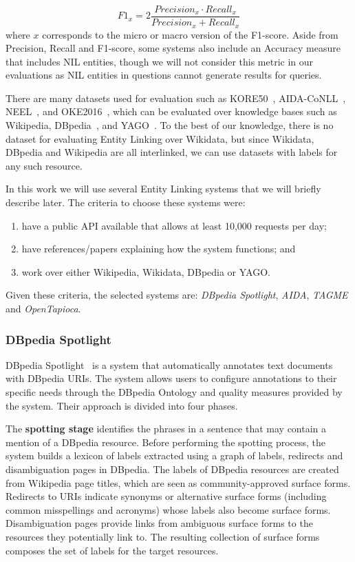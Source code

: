\[
    F1_x = 2 \frac{Precision_x \cdot Recall_x}{Precision_x + Recall_x}
\]
\noindent where $x$ corresponds to the micro or macro version of the F1-score. Aside from Precision, 
Recall and F1-score, some systems also include an Accuracy measure that includes NIL entities, 
though we will not consider this metric in our evaluations as NIL entities in questions 
cannot generate results for queries.

There are many datasets used for evaluation such as KORE50~\cite{entlin:HoffartSNTW12}, 
AIDA-CoNLL~\cite{EL:aida-HoffartYBFPSTTW11}, NEEL~\cite{entlin:RizzoBPV15}, and 
OKE2016~\cite{entlin:Plu0T16}, which can be evaluated over knowledge bases such as Wikipedia, 
DBpedia~\cite{KG:dbpedia}, and YAGO~\cite{KG:yago}. To the best of our knowledge, there is 
no dataset for evaluating Entity Linking over Wikidata, but since Wikidata, DBpedia and 
Wikipedia are all interlinked, we can use datasets with labels for any such resource.

In this work we will use several Entity Linking systems that we will briefly describe later. 
The criteria to choose these systems were: 

\begin{enumerate}
    \item have a public API available that allows at least 10,000 requests per day; 
    \item have references/papers explaining how the system functions; and 
    \item work over either Wikipedia, Wikidata, DBpedia or YAGO. 
\end{enumerate}

Given these criteria, the selected systems are: \textit{DBpedia Spotlight}, \textit{AIDA}, 
\textit{TAGME} and \textit{OpenTapioca}.

\subsubsection{DBpedia Spotlight}
\label{cap2:theoFrame/infExtr/entityLinking/dbpediaSpotlight}
DBpedia Spotlight~\cite{EL:dbpedia-spotlight-MendesJGB11} is a system that automatically 
annotates text documents with DBpedia URIs. The system allows users to configure annotations 
to their specific needs through the DBpedia Ontology and quality measures provided by the 
system. Their approach is divided into four phases.

The \textbf{spotting stage} identifies the phrases in a sentence that may contain a mention 
of a DBpedia resource. Before performing the spotting process, the system builds a lexicon 
of labels extracted using a graph of labels, redirects and disambiguation pages in 
DBpedia. The labels of DBpedia resources are created from Wikipedia page titles, which are 
seen as community-approved surface forms. Redirects to URIs indicate synonyms or alternative 
surface forms (including common misspellings and acronyms) whose labels also become surface 
forms. Disambiguation pages provide links from ambiguous surface forms to the resources they 
potentially link to. The resulting collection of surface forms composes the set of labels for 
the target resources.

